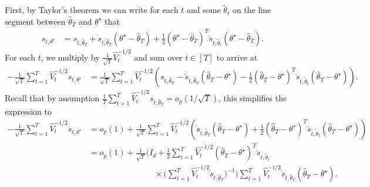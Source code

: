 \documentclass[11pt]{article}
\begin{document}
\begin{appendix}
First, by Taylor's theorem we can write for each $t$ and some $\tilde{\theta}_{t}$ on the line segment between $\hat{\theta}_{T}$ and $\theta^{\star}$ that
\begin{align*}
s_{t,\theta^{\star}} &= s_{t,\hat{\theta}_{T}}  + \dot{s}_{t,\hat{\theta}_{T}}(\theta^{\star} - \hat{\theta}_{T}) + \frac{1}{2} \left( \theta^{\star} - \hat{\theta}_{T}\right)^{T} \ddot{s}_{t,\tilde{\theta}_{t}} \left( \theta^{\star} -\hat{\theta}_{T}\right).
\end{align*}
For each $t$, we multiply by $\frac{1}{\sqrt{T}} \hat{V}_{t}^{-1/2}$ and sum over $t \in [T]$ to arrive at 
\begin{align*}
    -\frac{1}{\sqrt{T}} \sum_{t=1}^{T} \hat{V}_{t}^{-1/2} s_{t,\theta^{\star}} &= 
    \frac{1}{\sqrt{T}} \sum_{t=1}^{T} \hat{V}_{t}^{-1/2} \left(  s_{t,\hat{\theta}_{T}} - \dot{s}_{t,\hat{\theta}_{T}}(\hat{\theta}_{T}-\theta^{\star} )  -  \frac{1}{2}\left(  \hat{\theta}_{T}-\theta^{\star} \right)^{T} \ddot{s}_{t,\tilde{\theta}_{t}} \left( \hat{\theta}_{T}-\theta^{\star} \right) \right).
\end{align*}
Recall that by assumption $\frac{1}{T}\sum_{t=1}^{T} \hat{V}_{t}^{-1/2}s_{t,\hat{\theta}_{T}} = o_{p}(1/\sqrt{T})$, this simplifies the expression to 
\begin{align*}
 -\frac{1}{\sqrt{T}} \sum_{t=1}^{T} \hat{V}_{t}^{-1/2} s_{t,\theta^{\star}} &= o_{p}(1) + 
    \frac{1}{\sqrt{T}} \sum_{t=1}^{T} \hat{V}_{t}^{-1/2} \left(  \dot{s}_{t,\hat{\theta}_{T}}(\hat{\theta}_{T}-\theta^{\star} )  +  \frac{1}{2}\left(  \hat{\theta}_{T}-\theta^{\star} \right)^{T} \ddot{s}_{t,\tilde{\theta}_{t}} \left( \hat{\theta}_{T}-\theta^{\star} \right) \right)   \\
    &= o_{p}(1)
     + \frac{1}{\sqrt{T}}
     \Bigg(
         I_{d}
         + \frac{1}{2}
         \sum_{t=1}^{T}
         \hat{V}_{t}^{-1/2}
         (\hat{\theta}_{T}-\theta^{\star})^{T}
         \ddot{s}_{t,\tilde{\theta}_{t}}   \\
     &\qquad\qquad\qquad\qquad
         \times
         \Bigg(
            \sum_{t=1}^{T}
            \hat{V}_{t}^{-1/2}
            \dot{s}_{t,\hat{\theta}_{T}}
         \Bigg)^{-1}
     \Bigg)
     \sum_{t=1}^{T}
     \hat{V}_{t}^{-1/2}
     \dot{s}_{t,\hat{\theta}_{T}}
     (\hat{\theta}_{T}-\theta^{\star}) .
\end{align*}


\end{appendix}
\end{document}
